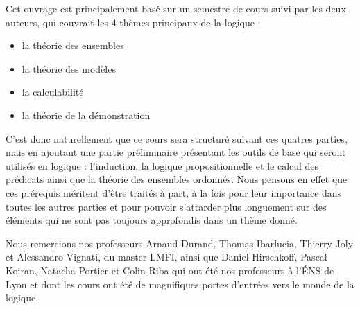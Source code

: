 Cet ouvrage est principalement basé sur un semestre de cours suivi par les deux
auteurs, qui couvrait les 4 thèmes principaux de la logique :
\begin{itemize}
\item la théorie des ensembles
\item la théorie des modèles
\item la calculabilité
\item la théorie de la démonstration
\end{itemize}

C'est donc naturellement que ce cours sera structuré suivant ces quatres
parties, mais en ajoutant une partie préliminaire présentant les outils de base
qui seront utilisés en logique : l'induction, la logique propositionnelle et le
calcul des prédicats ainsi que la théorie des ensembles ordonnés. Nous pensons
en effet que ces prérequis méritent d'être traités à part, à la fois pour leur
importance dans toutes les autres parties et pour pouvoir s'attarder plus
longuement sur des éléments qui ne sont pas toujours approfondis dans un thème
donné.

Nous remercions nos professeurs Arnaud Durand, Thomas Ibarlucia, Thierry Joly et
Alessandro Vignati, du master LMFI, ainsi que Daniel Hirschkoff, Pascal Koiran,
Natacha Portier et Colin Riba qui ont été nos professeurs à l'\'ENS de Lyon et
dont les cours ont été de magnifiques portes d'entrées vers le monde de la
logique.
